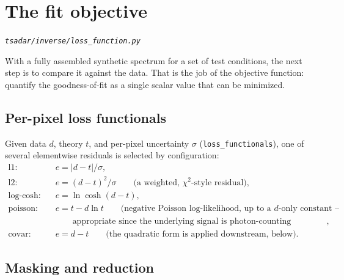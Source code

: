 \documentclass[11pt]{article}
\newcommand{\code}[1]{\texttt{#1}}
\newcommand{\file}[1]{\texttt{#1}}
\begin{document}
\section{The fit objective}\label{sec:loss}
\textit{\file{tsadar/inverse/loss\_function.py}}

With a fully assembled synthetic spectrum for a set of test conditions, the next step is
to compare it against the data. That is the job of the objective function: quantify the
goodness-of-fit as a single scalar value that can be minimized.
\subsection{Per-pixel loss functionals}

Given data $d$, theory $t$, and per-pixel uncertainty $\sigma$ (\code{loss\_functionals}),
one of several elementwise residuals is selected by configuration:
\begin{align}
  \text{l1:}\quad & e=\vert d-t\vert/\sigma, \\
  \text{l2:}\quad & e=(d-t)^2/\sigma \qquad\text{(a weighted, $\chi^2$-style residual)}, \\
  \text{log-cosh:}\quad & e=\ln\cosh(d-t), \\
  \text{poisson:}\quad & e=t-d\ln t \qquad\text{(negative Poisson log-likelihood, up to a $d$-only constant --}\\
  &\qquad\text{appropriate since the underlying signal is photon-counting statistics)}, \\
  \text{covar:}\quad & e=d-t \qquad\text{(the quadratic form is applied downstream, below).}
\end{align}

\subsection{Masking and reduction}
\end{document}
